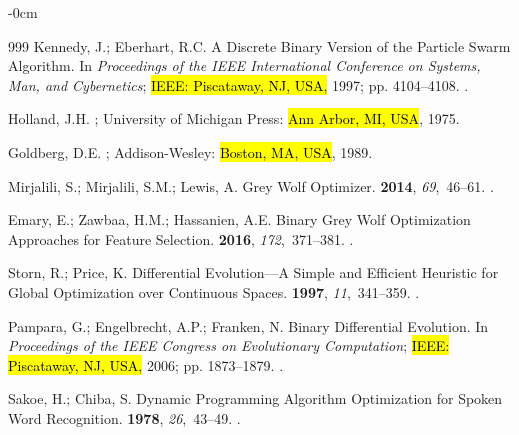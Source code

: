 \documentclass[mathematics,article,accept,moreauthors]{Definitions/mdpi}
\begin{document}
\begin{adjustwidth}{-\extralength}{0cm}
\begin{thebibliography}{999}
Kennedy, J.; Eberhart, R.C.
\newblock A Discrete Binary Version of the Particle Swarm Algorithm.
\newblock In \textit{Proceedings of the  IEEE International
  Conference on Systems, Man, and Cybernetics};
  \hl{IEEE: Piscataway, NJ, USA,}  1997; pp. 4104--4108.
.

Holland, J.H.
; University of
  Michigan Press: \hl{Ann Arbor, MI, USA},  1975.

Goldberg, D.E.
; Addison-Wesley: \hl{Boston, MA, USA},  1989.

Mirjalili, S.; Mirjalili, S.M.; Lewis, A.
\newblock Grey Wolf Optimizer.
 {\bf 2014}, {\em 69},~46--61.
.

Emary, E.; Zawbaa, H.M.; Hassanien, A.E.
\newblock Binary Grey Wolf Optimization Approaches for Feature Selection.
 {\bf 2016}, {\em 172},~371--381.
.

Storn, R.; Price, K.
\newblock Differential Evolution---A Simple and Efficient Heuristic for Global
  Optimization over Continuous Spaces.
 {\bf 1997}, {\em 11},~341--359.
.

Pampara, G.; Engelbrecht, A.P.; Franken, N.
\newblock Binary Differential Evolution.
\newblock In \textit{Proceedings of the  IEEE Congress on
  Evolutionary Computation}; 
  \hl{IEEE: Piscataway, NJ, USA,}   2006; pp. 1873--1879.
. %


Sakoe, H.; Chiba, S.
\newblock Dynamic Programming Algorithm Optimization for Spoken Word
  Recognition.
  {\bf 1978}, {\em 26},~43--49.
.


\end{thebibliography}
\end{adjustwidth}
\end{document}
